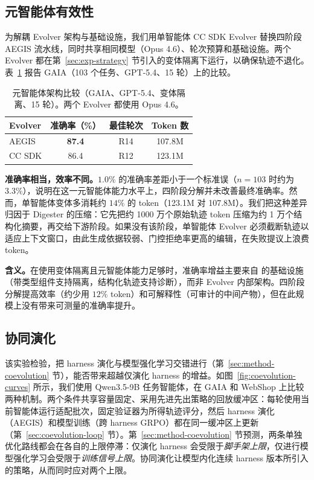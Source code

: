 \subsection{元智能体有效性}
\label{sec:exp-meta-agent}

为解耦 Evolver 架构与基础设施，我们用单智能体 CC SDK Evolver 替换四阶段 AEGIS 流水线，同时共享相同模型（Opus 4.6）、轮次预算和基础设施。两个 Evolver 都在第~\ref{sec:exp-strategy} 节引入的变体隔离下运行，以确保轨迹不退化。表~\ref{tab:meta-agent} 报告 GAIA（103 个任务、GPT-5.4、15 轮）上的比较。

\begin{table}[!htbp]
\centering
\small
\caption{元智能体架构比较（GAIA、GPT-5.4、变体隔离、15 轮）。两个 Evolver 都使用 Opus 4.6。}
\label{tab:meta-agent}
\begin{tabular}{lccc}
\toprule
\textbf{Evolver} & \textbf{准确率（\%）} & \textbf{最佳轮次} & \textbf{Token 数} \\
\midrule
AEGIS & \textbf{87.4} & R14 & 107.8M \\
CC SDK & 86.4 & R12 & 123.1M \\
\bottomrule
\end{tabular}
\end{table}

\textbf{准确率相当，效率不同。}$1.0\%$ 的准确率差距小于一个标准误（$n{=}103$ 时约为 $3.3\%$），说明在这一元智能体能力水平上，四阶段分解并未改善最终准确率。然而，单智能体变体多消耗约 $14\%$ 的 token（123.1M 对 107.8M）。我们把这种差异归因于 Digester 的压缩：它先把约 1000 万个原始轨迹 token 压缩为约 1 万个结构化摘要，再交给下游阶段。如果没有该阶段，单智能体 Evolver 必须截断轨迹以适应上下文窗口，由此生成依据较弱、门控拒绝率更高的编辑，在失败提议上浪费 token。

\textbf{含义。}在使用变体隔离且元智能体能力足够时，准确率增益主要来自 \ProjectName 的基础设施（带类型组件支持隔离，结构化轨迹支持诊断），而非 Evolver 内部架构。四阶段分解提高效率（约少用 $12\%$ token）和可解释性（可审计的中间产物），但在此规模上没有带来可测量的准确率提升。

\subsection{协同演化}
\label{sec:exp-coevolution}

该实验检验，把 harness 演化与模型强化学习交错进行（第~\ref{sec:method-coevolution} 节），能否带来超越仅演化 harness 的增益。如图~\ref{fig:coevolution-curves} 所示，我们使用 Qwen3.5-9B 任务智能体，在 GAIA 和 WebShop 上比较两种机制。两个条件共享容量固定、采用先进先出策略的回放缓冲区：每轮使用当前智能体运行适配批次，固定验证器为所得轨迹评分，然后 harness 演化（AEGIS）和模型训练（跨 harness GRPO）都在同一缓冲区上更新（第~\ref{sec:coevolution-loop} 节）。第~\ref{sec:method-coevolution} 节预测，两条单独优化路线都会在各自的上限停滞：仅演化 harness 会受限于\textit{脚手架上限}，仅进行模型强化学习会受限于\textit{训练信号上限}。协同演化让模型内化连续 harness 版本所引入的策略，从而同时应对两个上限。

